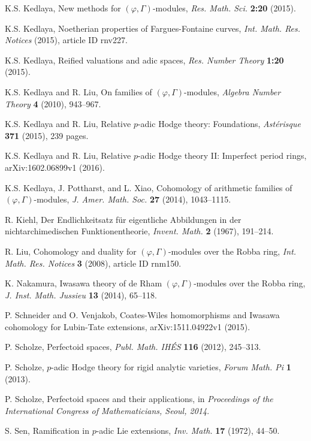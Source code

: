 \documentclass[12pt]{amsart}
\theoremstyle{definition}
\numberwithin{equation}{theorem}
\begin{document}
\begin{thebibliography}{99}
K.S. Kedlaya, New methods for $(\varphi, \Gamma)$-modules,
\textit{Res. Math. Sci.} \textbf{2:20} (2015).

K.S. Kedlaya, Noetherian properties of Fargues-Fontaine curves,
\textit{Int. Math. Res. Notices} (2015), article ID rnv227. 

K.S. Kedlaya, Reified valuations and adic spaces, \textit{Res. Number Theory}
\textbf{1:20} (2015).

K.S. Kedlaya and R. Liu, On families of $(\varphi, \Gamma)$-modules,
\textit{Algebra Number Theory} \textbf{4} (2010), 943--967.

K.S. Kedlaya and R. Liu, Relative $p$-adic Hodge theory: Foundations,
\textit{Ast\'erisque} \textbf{371} (2015), 239 pages. 

K.S. Kedlaya and R. Liu, Relative $p$-adic Hodge theory II: Imperfect period rings,
arXiv:1602.06899v1 (2016).

K.S. Kedlaya, J. Pottharst, and L. Xiao, Cohomology of arithmetic families of $(\varphi, \Gamma)$-modules, \textit{J. Amer. Math. Soc.}  \textbf{27} (2014), 1043--1115. 

R. Kiehl, Der Endlichkeitsatz f\"ur eigentliche Abbildungen
in der nichtarchimedischen Funktionentheorie,
\textit{Invent. Math.} \textbf{2} (1967), 191--214.

R. Liu, Cohomology and duality for $(\varphi, \Gamma)$-modules over the Robba ring,
\textit{Int. Math. Res. Notices} \textbf{3} (2008), article ID rnm150.

K. Nakamura, Iwasawa theory of de Rham $(\varphi, \Gamma)$-modules over the Robba ring,
\textit{J. Inst. Math. Jussieu} \textbf{13} (2014), 65--118. 

P. Schneider and O. Venjakob, Coates-Wiles homomorphisms and Iwasawa cohomology for Lubin-Tate extensions, arXiv:1511.04922v1 (2015).

P. Scholze, Perfectoid spaces, \textit{Publ. Math. IH\'ES} \textbf{116} (2012), 245--313.

P. Scholze, $p$-adic Hodge theory for rigid analytic varieties, \textit{Forum Math. Pi} \textbf{1} (2013).

P. Scholze, Perfectoid spaces and their applications, in \textit{Proceedings of the
International Congress of Mathematicians, Seoul, 2014}.

S. Sen, Ramification in $p$-adic Lie extensions,
\textit{Inv. Math.} \textbf{17} (1972), 44--50.

\end{thebibliography}
\end{document}

